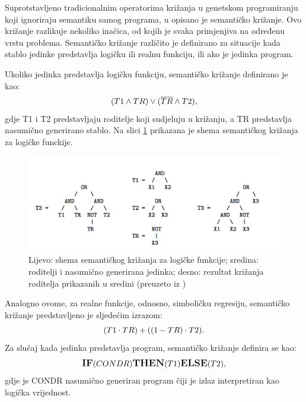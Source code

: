 Suprotstavljeno tradicionalnim operatorima križanja u genetskom programiranju koji ignoriraju semantiku samog programa, u \cite{crxSem} opisano je semantičko križanje. 
Ovo križanje razlikuje nekoliko inačica, od kojih je svaka primjenjiva na određenu vrstu problema. Semantičko križanje različito je definirano za situacije kada stablo jedinke predstavlja logičku ili realnu funkciju, ili ako je jedinka program.

Ukoliko jedinka predstavlja logičku funkciju, semantičko križanje definirano je kao:
 \begin{equation} 
\label{log}
 \large{ (T1 \land TR) \vee   (\overline{TR} \land T2) },
\end{equation}
gdje T1 i T2 predstavljaju roditelje koji sudjeluju u križanju, a TR predstavlja nasumično generirano stablo. Na slici \ref{semBool} prikazana je shema semantičkog križanja za logičke funckije.

 \begin{figure}[H]
	\centering
	\includegraphics[scale=0.4]{./slike/semBool1.png}
	\caption{Lijevo: shema semantičkog križanja za logičke funkcije; sredina: roditelji i nasumično generirana jedinka; desno: rezultat križanja roditelja prikazanih u sredini (preuzeto iz \cite{crxSem})}
	\label{semBool}
\end{figure}
  
   
     Analogno ovome, za realne funkcije, odnosno, simboličku regresiju, semantičko križanje predstavljeno je sljedećim izrazom:
 \begin{equation} 
\label{log}
 \large{ (T1 \cdot TR) +   ((1-TR) \cdot T2) }.
\end{equation}
Za slučaj kada jedinka predstavlja program, semantičko križanje definira se kao:
 \begin{equation} 
\label{log}
 \large{ \textbf{IF}(CONDR) \textbf{THEN} (T1) \textbf{ELSE} (T2)},
\end{equation}
gdje je CONDR nasumično generiran program čiji je izlaz interpretiran kao logička vrijednost.

